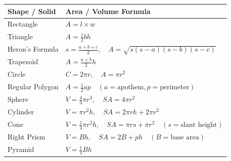 \begin{table}[h!]
\centering
\small
\begin{tabular}{|l|l|}
\hline
\textbf{Shape / Solid} & \textbf{Area / Volume Formula} \\ \hline
Rectangle & $A = l \times w$ \\ \hline
Triangle & $A = \frac{1}{2} b h$ \\ \hline
Heron's Formula & $s = \frac{a+b+c}{2}, \quad A = \sqrt{s(s-a)(s-b)(s-c)}$ \\ \hline
Trapezoid & $A = \frac{a + b}{2} h$ \\ \hline
Circle & $C = 2\pi r, \quad A = \pi r^2$ \\ \hline
Regular Polygon & $A = \frac{1}{2} a p \quad (a = \text{apothem}, p = \text{perimeter})$ \\ \hline
Sphere & $V = \frac{4}{3} \pi r^3, \quad SA = 4 \pi r^2$ \\ \hline
Cylinder & $V = \pi r^2 h, \quad SA = 2\pi r h + 2\pi r^2$ \\ \hline
Cone & $V = \frac{1}{3} \pi r^2 h, \quad SA = \pi r s + \pi r^2 \quad (s = \text{slant height})$ \\ \hline
Right Prism & $V = B h, \quad SA = 2B + p h \quad (B = \text{base area})$ \\ \hline
Pyramid & $V = \frac{1}{3} B h$ \\ \hline
\end{tabular}
\end{table}
